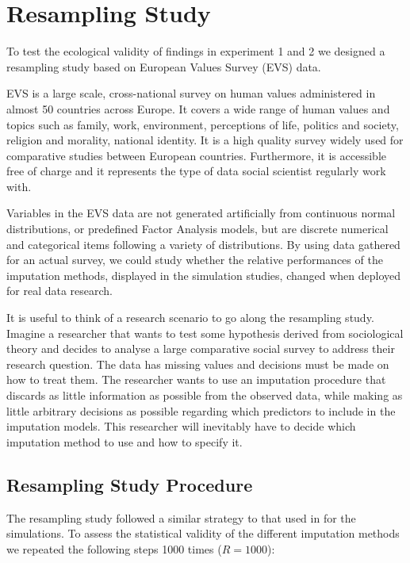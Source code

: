 \section{Resampling Study}

To test the ecological validity of findings in experiment 1 and 2 we designed a resampling study 
based on European Values Survey (EVS) data.

EVS is a large scale, cross-national survey on human values administered in almost 50 countries
across Europe.
It covers a wide range of human values and topics such as family, work, environment, perceptions of life, 
politics and society, religion and morality, national identity.
It is a high quality survey widely used for comparative studies between European countries.
Furthermore, it is accessible free of charge and it represents the type of data social scientist 
regularly work with.

Variables in the EVS data are not generated artificially from continuous normal distributions, 
or predefined Factor Analysis models, but are discrete numerical and categorical items following a 
variety of distributions.
By using data gathered for an actual survey, we could study whether the relative performances of 
the imputation methods, displayed in the simulation studies, changed when deployed for real data 
research.

It is useful to think of a research scenario to go along the resampling study.
Imagine a researcher that wants to test some hypothesis derived from sociological theory and 
decides to analyse a large comparative social survey to address their research question.
The data has missing values and decisions must be made on how to treat them.
The researcher wants to use an imputation procedure that discards as little information as possible 
from the observed data, while making as little arbitrary decisions as possible regarding which 
predictors to include in the imputation models.
This researcher will inevitably have to decide which imputation method to use and how to specify it.

\subsection{Resampling Study Procedure} \label{resProc}

The resampling study followed a similar strategy to that used in for the simulations. 
To assess the statistical validity of the different imputation methods we repeated the 
following steps 1000 times ($R = 1000$):

